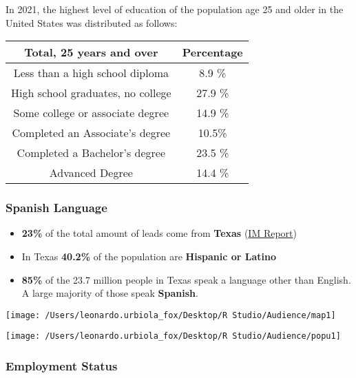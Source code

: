 \documentclass[
]{article}
\begin{document}
In 2021, the highest level of education of the population age 25 and
older in the United States was distributed as follows:

\begin{longtable}[]{@{}cc@{}}
\toprule()
\textbf{Total, 25 years and over} & \textbf{Percentage} \\
\midrule()
\endhead
Less than a high school diploma & 8.9 \% \\
High school graduates, no college & 27.9 \% \\
Some college or associate degree & 14.9 \% \\
Completed an Associate's degree & 10.5\% \\
Completed a Bachelor's degree & 23.5 \% \\
Advanced Degree & 14.4 \% \\
\bottomrule()
\end{longtable}

\hypertarget{spanish-language}{%
\subsubsection{Spanish Language}\label{spanish-language}}

\begin{itemize}
\item
  \textbf{23\%} of the total amount of leads come from \textbf{Texas}
  (\href{https://app.powerbi.com/groups/me/reports/f381dddc-6f32-4138-82a4-185b134a5c79/ReportSectionad6d6d8da06eb3248e83/}{IM
  Report})
\item
  In Texas \textbf{40.2\%} of the population are \textbf{Hispanic or
  Latino}
\item
  \textbf{85\%} of the 23.7 million people in Texas speak a language
  other than English. A large majority of those speak \textbf{Spanish}.
\end{itemize}

\begin{center}\texttt{[image: /Users/leonardo.urbiola\_fox/Desktop/R Studio/Audience/map1]} \end{center}

\begin{center}\texttt{[image: /Users/leonardo.urbiola\_fox/Desktop/R Studio/Audience/popu1]} \end{center}

\hypertarget{employment-status}{%
\subsubsection{Employment Status}\label{employment-status}}
\end{document}
